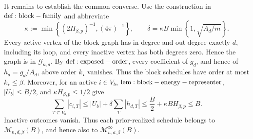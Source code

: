 It remains to establish the common converse. Use the construction in \({\rm def:block-family}\) and abbreviate
\[
\kappa:=\min\!\left\{(2H_{\beta,p})^{-1},(4\pi)^{-1}\right\},
\qquad
\delta=\kappa B\min\!\left\{1,\sqrt{A_d/m}\right\}.
\]
Every active vertex of the block graph has in-degree and out-degree exactly \(d\), including its loop, and every inactive vertex has both degrees zero. Hence the graph is in \(\mathcal G_{n,d}\). By \({\rm def:exposed-order}\), every coefficient of \(g_d\), and hence of \(h_d=g_d/A_d\), above order \(k_\star\) vanishes. Thus the block schedules have order at most \(k_\star\le\beta\). Moreover, for an active \(i\in V_b\), \({\rm lem:block-energy-representer}\), \(|U_b|\le B/2\), and \(\kappa H_{\beta,p}\le1/2\) give
\[
\sum_{T\subseteq V_b}|c_{i,T}|
\le |U_b|+\delta\sum_T|h_{d,T}|
\le\frac B2+\kappa BH_{\beta,p}
\le B.
\]
Inactive outcomes vanish. Thus each prior-realized schedule belongs to \(\mathcal M_{n,d,\beta}(B)\), and hence also to \(\mathcal M_{n,d,\beta}^{\infty}(B)\).


